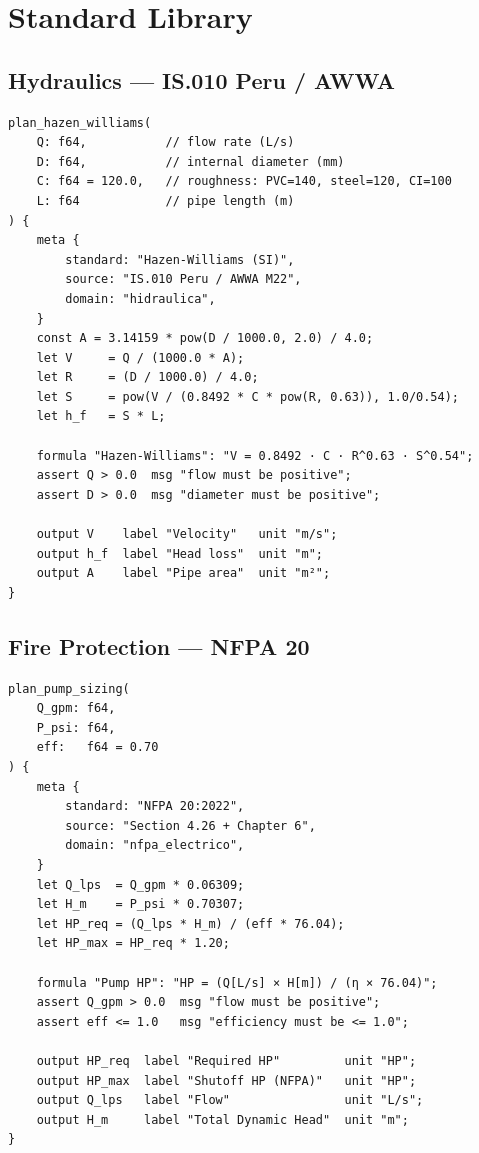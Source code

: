 \documentclass[12pt,a4paper]{article}
\begin{document}
\section{Standard Library}

\subsection{Hydraulics — IS.010 Peru / AWWA}

\begin{lstlisting}[caption=plan\_hazen\_williams — IS.010 Peru / AWWA M22]
plan_hazen_williams(
    Q: f64,           // flow rate (L/s)
    D: f64,           // internal diameter (mm)
    C: f64 = 120.0,   // roughness: PVC=140, steel=120, CI=100
    L: f64            // pipe length (m)
) {
    meta {
        standard: "Hazen-Williams (SI)",
        source: "IS.010 Peru / AWWA M22",
        domain: "hidraulica",
    }
    const A = 3.14159 * pow(D / 1000.0, 2.0) / 4.0;
    let V     = Q / (1000.0 * A);
    let R     = (D / 1000.0) / 4.0;
    let S     = pow(V / (0.8492 * C * pow(R, 0.63)), 1.0/0.54);
    let h_f   = S * L;

    formula "Hazen-Williams": "V = 0.8492 · C · R^0.63 · S^0.54";
    assert Q > 0.0  msg "flow must be positive";
    assert D > 0.0  msg "diameter must be positive";

    output V    label "Velocity"   unit "m/s";
    output h_f  label "Head loss"  unit "m";
    output A    label "Pipe area"  unit "m²";
}
\end{lstlisting}

\subsection{Fire Protection — NFPA 20}

\begin{lstlisting}[caption=plan\_pump\_sizing — NFPA 20:2022 §4.26]
plan_pump_sizing(
    Q_gpm: f64,
    P_psi: f64,
    eff:   f64 = 0.70
) {
    meta {
        standard: "NFPA 20:2022",
        source: "Section 4.26 + Chapter 6",
        domain: "nfpa_electrico",
    }
    let Q_lps  = Q_gpm * 0.06309;
    let H_m    = P_psi * 0.70307;
    let HP_req = (Q_lps * H_m) / (eff * 76.04);
    let HP_max = HP_req * 1.20;

    formula "Pump HP": "HP = (Q[L/s] × H[m]) / (η × 76.04)";
    assert Q_gpm > 0.0  msg "flow must be positive";
    assert eff <= 1.0   msg "efficiency must be <= 1.0";

    output HP_req  label "Required HP"         unit "HP";
    output HP_max  label "Shutoff HP (NFPA)"   unit "HP";
    output Q_lps   label "Flow"                unit "L/s";
    output H_m     label "Total Dynamic Head"  unit "m";
}
\end{lstlisting}
\end{document}
